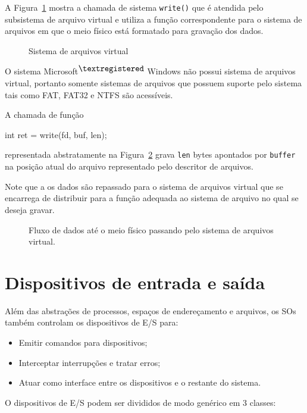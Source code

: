 A Figura~\ref{fig:vfs} mostra a chamada de sistema {\tt write()} que é
atendida pelo subsistema de arquivo virtual e utiliza a função
correspondente para o sistema de arquivos em que o meio físico está
formatado para gravação dos dados.

\begin{figure}[h]
  \centering
    
  \caption{Sistema de arquivos virtual}
  \label{fig:vfs}
\end{figure}

O sistema Microsoft\textsuperscript{$\textregistered$} Windows não
possui sistema de arquivos virtual, portanto somente sistemas de
arquivos que possuem suporte pelo sistema tais como FAT, FAT32 e NTFS
são acessíveis.


A chamada de função 

\begin{tt}
  int ret = write(fd, buf, len);
\end{tt}

representada abstratamente na Figura~\ref{fig:vfs:sys} grava {\tt len}
bytes apontados por {\tt buffer} na posição atual do arquivo
representado pelo descritor de arquivos.

Note que a os dados são repassado para o sistema de arquivos virtual
que se encarrega de distribuir para a função adequada ao sistema de
arquivo no qual se deseja gravar.

\begin{figure}[h]
  \centering
  
  \caption{Fluxo de dados até o meio físico passando pelo sistema de arquivos virtual.}
  \label{fig:vfs:sys}
\end{figure}

\section{Dispositivos de entrada e saída}

Além das abstrações de processos, espaços de endereçamento e arquivos,
os SOs também controlam os dispositivos de E/S para:

\begin{itemize}
\item Emitir comandos para dispositivos;
\item Interceptar interrupções e tratar erros;
\item Atuar como interface entre os dispositivos e o restante do sistema.
\end{itemize}

O dispositivos de E/S podem ser divididos de modo genérico em 3
classes:

